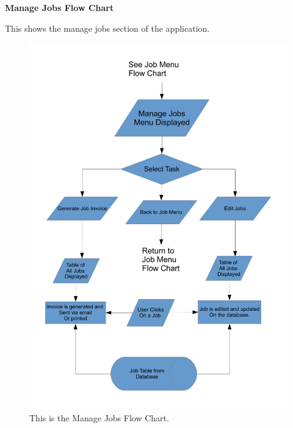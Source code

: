 \pagebreak
\textbf{Manage Jobs Flow Chart}
\begin{flushleft}
This shows the manage jobs section of the application.
\end{flushleft}
\begin{figure}[H]
\includegraphics[scale=0.5]{./Design/images/FlowChartManageJobs.pdf}
    \caption{This is the Manage Jobs Flow Chart.} 
\label{fig:FlowChartManageJobs}
\end{figure}



